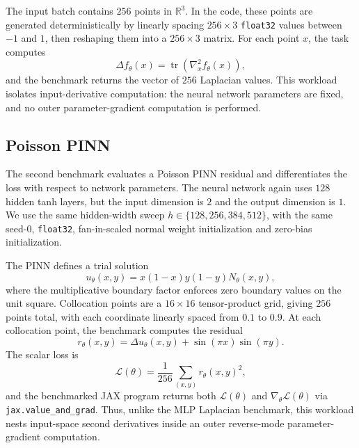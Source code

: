 \documentclass{article}
\theoremstyle{plain}
\theoremstyle{definition}
\theoremstyle{remark}
\begin{document}
The input batch contains \(256\) points in \(\mathbb{R}^3\).  In the code, these
points are generated deterministically by linearly spacing
\(256 \times 3\) \texttt{float32} values between \(-1\) and \(1\), then
reshaping them into a \(256 \times 3\) matrix.  For each point \(x\), the task
computes
\[
  \Delta f_\theta(x)
  =
  \operatorname{tr}\left(\nabla_x^2 f_\theta(x)\right),
\]
and the benchmark returns the vector of \(256\) Laplacian values.  This workload
isolates input-derivative computation: the neural network parameters are fixed,
and no outer parameter-gradient computation is performed.

\subsection{Poisson PINN}
The second benchmark evaluates a Poisson PINN residual and differentiates the
loss with respect to network parameters.  The neural network again uses
\(128\) hidden tanh layers, but the input dimension is \(2\) and the output
dimension is \(1\).  We use the same hidden-width sweep
\(h \in \{128,256,384,512\}\), with the same seed-\(0\), \texttt{float32},
fan-in-scaled normal weight initialization and zero-bias initialization.

The PINN defines a trial solution
\[
  u_\theta(x,y) = x(1-x)y(1-y)N_\theta(x,y),
\]
where the multiplicative boundary factor enforces zero boundary values on the
unit square.  Collocation points are a \(16 \times 16\) tensor-product grid,
giving \(256\) points total, with each coordinate linearly spaced from \(0.1\)
to \(0.9\).  At each collocation point, the benchmark computes the residual
\[
  r_\theta(x,y)
  =
  \Delta u_\theta(x,y)
  +
  \sin(\pi x)\sin(\pi y).
\]
The scalar loss is
\[
  \mathcal{L}(\theta)
  =
  \frac{1}{256}\sum_{(x,y)} r_\theta(x,y)^2,
\]
and the benchmarked JAX program returns both
\(\mathcal{L}(\theta)\) and \(\nabla_\theta \mathcal{L}(\theta)\) via
\texttt{jax.value\_and\_grad}.  Thus, unlike the MLP Laplacian benchmark, this
workload nests input-space second derivatives inside an outer reverse-mode
parameter-gradient computation.
\end{document}
